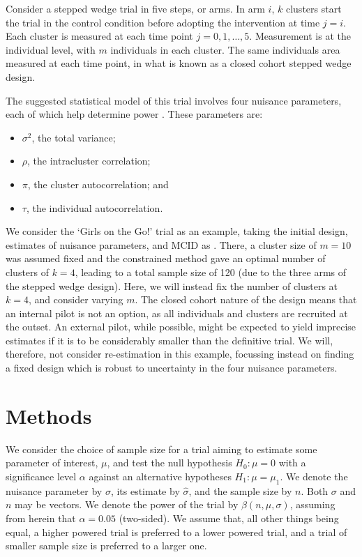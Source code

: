 \documentclass[sagev, Crown]{sagej}
\begin{document}
Consider a stepped wedge trial in five steps, or arms. In arm $i$, $k$ clusters start the trial in the control condition before adopting the intervention at time $j = i$. Each cluster is measured at each time point $j = 0, 1, \ldots , 5$. Measurement is at the individual level, with $m$ individuals in each cluster. The same individuals area measured at each time point, in what is known as a closed cohort stepped wedge design.

The suggested statistical model of this trial involves four nuisance parameters, each of which help determine power \cite{Hooper2016}. These parameters are:
\begin{itemize}
\item $\sigma^2$, the total variance;
\item $\rho$, the intracluster correlation;
\item $\pi$, the cluster autocorrelation; and
\item $\tau$, the individual autocorrelation.
\end{itemize}

We consider the `Girls on the Go!' trial as an example, taking the initial design, estimates of nuisance parameters, and MCID as \cite{Hooper2016}. There, a cluster size of $m = 10$ was assumed fixed and the constrained method gave an optimal number of clusters of $k = 4$, leading to a total sample size of 120 (due to the three arms of the stepped wedge design). Here, we will instead fix the number of clusters at $k = 4$, and consider varying $m$. The closed cohort nature of the design means that an internal pilot is not an option, as all individuals and clusters are recruited at the outset. An external pilot, while possible, might be expected to yield imprecise estimates if it is to be considerably smaller than the definitive trial. We will, therefore, not consider re-estimation in this example, focussing instead on finding a fixed design which is robust to uncertainty in the four nuisance parameters.

\section{Methods}\label{sec:methods}

We consider the choice of sample size for a trial aiming to estimate some parameter of interest, $\mu$, and test the null hypothesis $H_0: \mu = 0$ with a significance level $\alpha$ against an alternative hypotheses $H_1: \mu = \mu_1$. We denote the nuisance parameter by $\sigma$, its estimate by $\hat{\sigma}$, and the sample size by $n$. Both $\sigma$ and $n$ may be vectors. We denote the power of the trial by $\beta(n, \mu, \sigma)$, assuming from herein that $\alpha = 0.05$ (two-sided). We assume that, all other things being equal, a higher powered trial is preferred to a lower powered trial, and a trial of smaller sample size is preferred to a larger one. 
\end{document}
